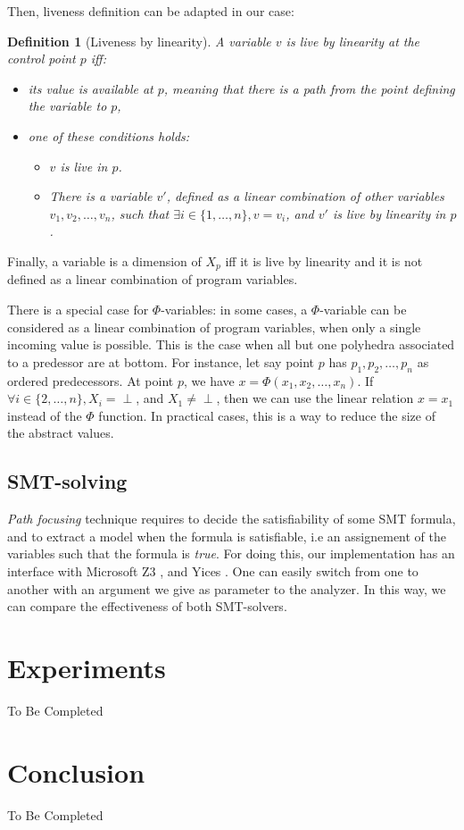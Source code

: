 \documentclass[a4paper,english,titlepage,11pt]{article}
\newtheorem{definition}{Definition}[section]
\begin{document}
	Then, liveness definition can be adapted in our case:

	\begin{definition}[Liveness by linearity]
	A variable $v$ is \emph{live by linearity} at the control point $p$ iff:
	\begin{itemize}
	\item 
	its value is available at $p$, meaning that there is a path from the
	point defining the variable to $p$,
	\item one of these conditions holds:
		\begin{itemize}
		\item $v$ is live in $p$.
		\item There is a variable $v'$, defined as a linear combination of other
		variables $v_1, v_2, \dots, v_n$, such that $\exists i \in \{1,\dots,n\}, v = v_i$,
		and $v'$ is live by linearity in $p$.
		\end{itemize}
	\end{itemize}
	\end{definition}

	Finally, a variable is a dimension of $X_p$ iff it is live by linearity and
	it is not defined as a linear combination of program variables.


	There is a special case for $\Phi$-variables: in some cases, a
	$\Phi$-variable can be considered as a linear combination of program
	variables, when only a single incoming value is possible. This is the case
	when all but one polyhedra associated to a predessor are at bottom.
	For instance, let say point $p$ has $p_1, p_2, \dots, p_n$ as ordered 
	predecessors. At point $p$, we have $x = \Phi(x_1, x_2,\dots,x_n)$.
	If $\forall i \in \{2,\dots,n\}, X_i = \perp$, and $X_1 \neq \perp$, then we
	can use the linear relation $x = x_1$ instead of the $\Phi$ function. In
	practical cases, this is a way to reduce the size of the abstract values.


	\subsection{SMT-solving}

	\emph{Path focusing} technique requires to decide the satisfiability of some
	SMT formula, and to extract a model when the formula is satisfiable, i.e an
	assignement of the variables such that the formula is \emph{true}. For doing
	this, our implementation has an interface with Microsoft Z3 \cite{MouraB08},
	and Yices \cite{DutertreM06}. One can easily switch from one to another with
	an argument we give as parameter to the analyzer. In this way, we can
	compare the effectiveness of both SMT-solvers.


 \section{Experiments}

	To Be Completed


  \section*{Conclusion}
  
	To Be Completed

  \appendix
  


  
\end{document}
